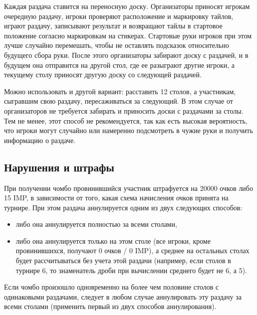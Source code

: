\vspace{0.3cm}

Каждая раздача ставится на переносную доску. Организаторы приносят игрокам очередную раздачу, игроки проверяют расположение и маркировку тайлов, играют раздачу, записывают результат и возвращают тайлы в стартовое положение согласно маркировкам на стикерах. Стартовые руки игроков при этом лучше случайно перемешать, чтобы не оставлять подсказок относительно будущего сбора руки. После этого организаторы забирают доску с раздачей, и в будущем она отправится на другой стол, где ее разыграют другие игроки, а текущему столу приносят другую доску со следующей раздачей.

\vspace{0.3cm}

Можно использовать и другой вариант: расставить 12 столов, а участникам, сыгравшим свою раздачу, пересаживаться за следующий. В этом случае от организаторов не требуется забирать и приносить доски с раздачами за столы. Тем не менее, этот способ не рекомендуется, так как есть высокая вероятность, что игроки могут случайно или намеренно подсмотреть в чужие руки и получить информацию о раздаче.

\subsection{Нарушения и штрафы}

При получении чомбо провинившийся участник штрафуется на 20000 очков либо 15 IMP, в зависимости от того, какая схема начисления очков принята на турнире. При этом раздача аннулируется одним из двух следующих способов:

\begin{itemize}
	\item либо она аннулируется полностью за всеми столами,
	\item либо она аннулируется только на этом столе (все игроки, кроме провинившихся, получают 0 очков / 0 IMP), а среднее на остальных столах будет рассчитываться без учета этой раздачи (например, если столов в турнире 6, то знаменатель дроби при вычислении среднего будет не 6, а 5).
\end{itemize}

\vspace{0.3cm}

Если чомбо произошло одновременно на более чем половине столов с одинаковыми раздачами, следует в любом случае аннулировать эту раздачу за всеми столами (применить первый из двух способов аннулирования).

